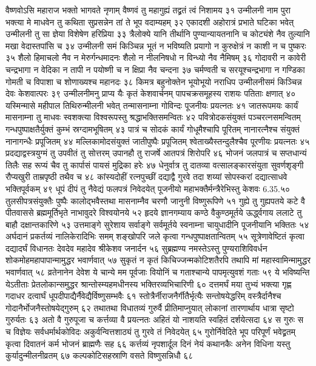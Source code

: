 वैष्णवोऽसि महाराज भक्तो भागवते नृणाम् 
वैष्णवं तु महागुह्यं तद्व्रतं त्वं निशामय ३१
उन्मीलनी नाम पुरा भक्त्या मे माधवेन तु 
कथिता सुप्रसन्नेन तां ते भूप वदाम्यहम् ३२
एकादशी अहोरात्रं प्रभाते घटिका भवेत् 
उन्मीलनी तु सा ज्ञेया विशेषेण हरिप्रिया ३३
त्रैलोक्ये यानि तीर्थानि पुण्यान्यायतनानि च 
कोट्यंशे नैव तुल्यानि मखा वेदास्तपांसि च ३४
उन्मीलनी समं किञ्चिन्न भूतं न भविष्यति 
प्रयागो न कुरुक्षेत्रं न काशी न च पुष्करः ३५
शैलो हिमाचलो नैव न मेरुर्गन्धमादनः 
शैलो न नीलनिषधो न विन्ध्यो नैव नैमिषम् ३६
गोदावरी न कावेरी चन्द्रभागा न वेदिका 
न तापी न पयोष्णी च न क्षिप्रा नैव चन्दना ३७
चर्मण्वती च सरयूश्चन्द्रभागा न गण्डिका 
गोमती च विपाशा च शोणाख्यश्च महानदः ३८
किमत्र बहुनोक्तेन भूयोभूयो नराधिप 
उन्मीलनीसमं किञ्चिन्न देवः केशवात्परः ३९
उन्मीलनीमनु प्राप्य यैः कृतं केशवार्चनम् 
पापचक्रसमूहस्य राशयः पतिताः क्षणात् ४०
यस्मिन्मासे महीपाल तिथिरुन्मीलनी भवेत् 
तन्मासनाम्ना गोविन्दः पूजनीयः प्रयत्नतः ४१
जातरूपमयः कार्यं मासनाम्ना तु माधवः 
स्वशक्त्या विश्वरूपस्तु श्रद्धाभक्तिसमन्वितः ४२
पवित्रोदकसंयुक्तं पञ्चरत्नसमन्वितम् 
गन्धपुष्पाक्षतैर्युक्तं कुम्भं स्रग्दामभूषितम् ४३
पात्रं च सोदकं कार्यं गोधूमैश्चापि पूरितम् 
नानारत्नैश्च संयुक्तं नानागन्धैः प्रपूजितम् ४४
मल्लिकामोदसंयुक्तं जातीपुष्पैः प्रपूजितम् 
श्वेताख्यैस्तन्दुलैश्चैव पूरणीयः प्रयत्नतः ४५
प्रदद्याद्वस्त्रयुग्मं तु उपवीतं तु सोत्तरम् 
उपानहौ तु राजर्षे आतपत्रं शिरोपरि ४६
भोजनं जलपात्रं च सप्तधान्यं तिलैः सह 
रूप्यं चैव तु कार्पासं पायसं मुद्रिका हरेः ४७
धेनुर्वात्र तु दातव्या वत्सालङ्कारसंयुता 
सुवर्णशृङ्गी रौप्यखुरी ताम्रपृष्ठी तथैव च ४८
कांस्यदोहीं रत्नपुच्छीं दद्याद्वै गुरवे तदा 
शय्यां सोपस्करां दद्यात्साधवे भक्तिपूर्वकम् ४९
धूपं दीपं तु नैवेद्यं फलपत्रं निवेदयेत् 
पूजनीयो महाभक्तैर्मन्त्रैरेभिस्तु केशवः 6.35.५०
तुलसीपत्रसंयुक्तैः पुष्पैः कालोद्भवैस्तथा 
मासनाम्नैव चरणौ जानुनी विष्णुरूपिणे ५१
गुह्ये तु गुह्यपतये कटे वै पीतवाससे 
ब्रह्ममूर्तिभृते नाभावुदरे विश्वयोनये ५२
हृदये ज्ञानगम्याय कण्ठे वैकुण्ठमूर्तये 
ऊर्द्ध्वगाय ललाटे तु बाहौ दक्षान्तकारिणे ५३
उत्तमाङ्गे सुरेशाय सर्वाङ्गे सर्वमूर्तये 
स्वनाम्ना चायुधादीनि पूजनीयानि भक्तितः ५४
अर्घदानं प्रकर्तव्यं नालिकेरादिभिः समम् 
शङ्खोपरि जले कृत्वा गन्धपुष्पाक्षतान्वितम् ५५
सूत्रेणावेष्टितं कृत्वा दद्यादर्घं विधानतः 
देवदेव महादेव श्रीकेशव जनार्दन ५६
सुब्रह्मण्य नमस्तेऽस्तु पुण्यराशिविवर्धन 
शोकमोहमहापापान्मामुद्धर भवार्णवात् ५७
सुकृतं न कृतं किचिज्जन्मकोटिशतैरपि 
तथापि मां महास्वामिन्मामुद्धर भवार्णवात् ५८
व्रतेनानेन देवेश ये चान्ये मम पूर्वजाः 
वियोनिं च गताश्चान्ये पापमृत्युवशं गताः ५९
ये भविष्यन्ति येऽतीताः प्रेतलोकान्समुद्धर 
श्रान्तोस्म्यहमधीनस्य भक्तिरव्यभिचारिणी ६०
दत्तमर्घं मया तुभ्यं भक्त्या गृह्ण गदाधर 
दत्वार्घं धूपदीपाद्यैर्नैवेद्यैर्विष्णुसम्भवैः ६१
स्तोत्रैर्नीराजनैर्गीतैर्भृत्यैः सन्तोषयेद्धरिम् 
वस्त्रैर्दानैश्च गोदानैर्भोजनैस्तोषयेद्गुरुम् ६२
तथातथा विधातव्यं गुरुर्वै प्रीतिमाप्नुयात् 
लोकानां तारणार्थाय धात्रा सृष्टो गुरुर्यतः ६३
अतो वै गुरुपूजा च कर्त्तव्या वै प्रयत्नतः 
अहितं यो नाशयति स्वहितं दर्शयेत्सदा ६४
स गुरुः स च विज्ञेयः सर्वधर्मार्थकोविदः 
अकुर्वन्वित्तशाठ्यं तु गुरवे तं निवेदयेत् ६५
गुरोर्निवेदिते भूप परिपूर्णं भवेद्व्रतम् 
कृत्वा दिवातनं कर्म भोजनं ब्राह्मणैः सह ६६
कर्त्तव्यं नृपशार्दूल दिनं नेयं कथानकैः 
अनेन विधिना यस्तु कुर्यादुन्मीलनीव्रतम् ६७
कल्पकोटिसहस्राणि वसते विष्णुसन्निधौ ६८

